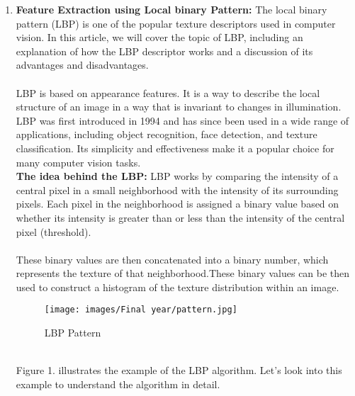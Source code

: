 \documentclass{report}
\begin{document}
{\begin{enumerate}
\begin{enumerate}
        \vspace{1cm}
        \begin{figure}[htbp]
            \centering
            \texttt{[image: images/Final year/leaf4.png]} %
            \caption{vein extract}
        \end{figure}
        \vspace{1cm}
    \end{enumerate}
    \item \textbf{Feature Extraction using Local binary Pattern: }
    The local binary pattern (LBP) is one of the popular texture descriptors used in computer vision. In this article, we will cover the topic of LBP, including an explanation of how the LBP descriptor works and a discussion of its advantages and disadvantages.
    \\ \\
    LBP is based on appearance features. It is a way to describe the local structure of an image in a way that is invariant to changes in illumination. LBP was first introduced in 1994 and has since been used in a wide range of applications, including object recognition, face detection, and texture classification. Its simplicity and effectiveness make it a popular choice for many computer vision tasks.\\
    \textbf{The idea behind the LBP: }LBP works by comparing the intensity of a central pixel in a small neighborhood with the intensity of its surrounding pixels. Each pixel in the neighborhood is assigned a binary value based on whether its intensity is greater than or less than the intensity of the central pixel (threshold). 
    \\ \\
    These binary values are then concatenated into a binary number, which represents the texture of that neighborhood.These binary values can be then used to construct a histogram of the texture distribution within an image.
    \vspace{1cm}
    \begin{figure}[htbp]
        \centering
        \texttt{[image: images/Final year/pattern.jpg]} %
        \caption{LBP Pattern}
    \end{figure}
    \vspace{1cm} \\
    Figure 1. illustrates the example of the LBP algorithm. Let’s look into this example to understand the algorithm in detail.
    \begin{enumerate}

\end{enumerate}
\end{enumerate}}
\end{document}
